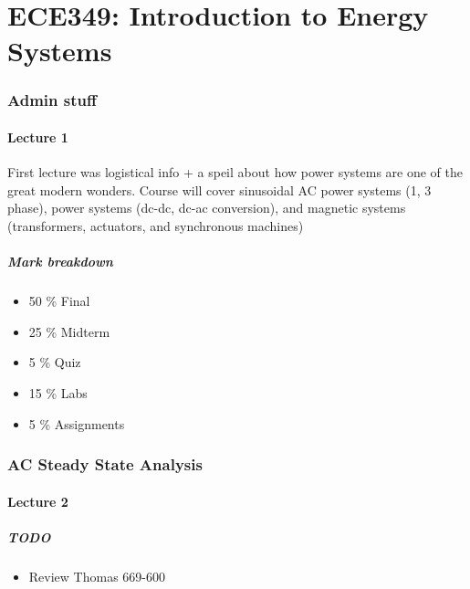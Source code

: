 \documentclass[../notes.tex]{subfiles}
\begin{document}
\part{ECE349: Introduction to Energy Systems}


\section{Admin stuff}
\subsection{Lecture 1}
First lecture was logistical info + a speil about how power systems are one of the great modern wonders. Course will cover sinusoidal AC power systems (1, 3 phase), power systems (dc-dc, dc-ac conversion), and magnetic systems (transformers, actuators, and synchronous machines)

\subsubsection{Mark breakdown}

\begin{itemize}
	\item 50 \% Final
	\item 25 \% Midterm
	\item 5 \% Quiz
	\item 15 \% Labs
	\item 5 \% Assignments
\end{itemize}



\section{AC Steady State Analysis}
\subsection{Lecture 2}

\subsubsection{TODO}
\begin{itemize}
	\item Review Thomas 669-600
\end{itemize}
\end{document}
